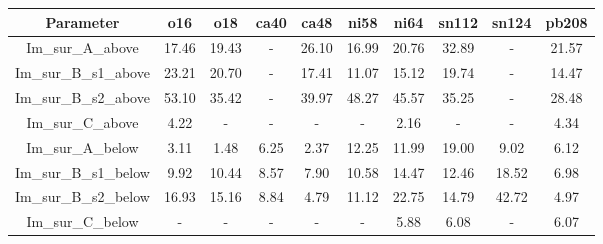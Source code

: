 \begin{tabular}{|c||c||c||c||c||c||c||c||c||c|} 
 \hline 
\bf{Parameter}& \bf{o16}& \bf{o18}& \bf{ca40}& \bf{ca48}& \bf{ni58}& \bf{ni64}& \bf{sn112}& \bf{sn124}& \bf{pb208}\\
 \hline
 \hline 
Im\_sur\_A\_above & 17.46 & 19.43 & - & 26.10 & 16.99 & 20.76 & 32.89 & - & 21.57\\
Im\_sur\_B\_s1\_above & 23.21 & 20.70 & - & 17.41 & 11.07 & 15.12 & 19.74 & - & 14.47\\
Im\_sur\_B\_s2\_above & 53.10 & 35.42 & - & 39.97 & 48.27 & 45.57 & 35.25 & - & 28.48\\
Im\_sur\_C\_above & 4.22 & - & - & - & - & 2.16 & - & - & 4.34\\
Im\_sur\_A\_below & 3.11 & 1.48 & 6.25 & 2.37 & 12.25 & 11.99 & 19.00 & 9.02 & 6.12\\
Im\_sur\_B\_s1\_below & 9.92 & 10.44 & 8.57 & 7.90 & 10.58 & 14.47 & 12.46 & 18.52 & 6.98\\
Im\_sur\_B\_s2\_below & 16.93 & 15.16 & 8.84 & 4.79 & 11.12 & 22.75 & 14.79 & 42.72 & 4.97\\
Im\_sur\_C\_below & - & - & - & - & - & 5.88 & 6.08 & - & 6.07\\

 \hline 
\end{tabular}